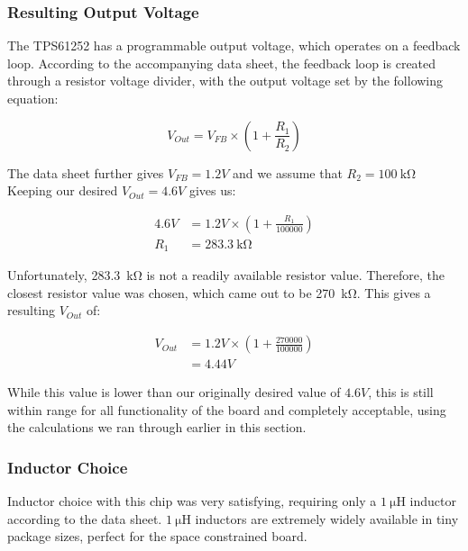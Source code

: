 \documentclass[11pt]{article}
\begin{document}
\subsubsection{Resulting Output Voltage}

The TPS61252 has a programmable output voltage, which operates on a feedback loop. According to the accompanying data sheet, the feedback loop is created through a resistor voltage divider, with the output voltage set by the following equation:

$$ V_{Out} = V_{FB} \times \left( 1 + \frac{R_1}{R_2} \right) $$

The data sheet further gives \(V_{FB} = 1.2V \) and we assume that \(R_2 = \SI{100}{\kilo\ohm}\)\footnotemark {} Keeping our desired \(V_{Out} = 4.6V\) gives us:

\begin{equation}
\begin{aligned}
	4.6V &= 1.2V \times \left( 1 + \frac{R_1}{100000} \right) \\
	R_1 &= \SI{283.3}{\kilo\ohm}
\end{aligned}	
\end{equation}

Unfortunately, \SI{283.3}{\kilo\ohm} is not a readily available resistor value. Therefore, the closest resistor value was chosen, which came out to be \SI{270}{\kilo\ohm}. This gives a resulting \(V_{Out}\) of:

\begin{equation}
\begin{aligned}
	V_{Out} &= 1.2V \times \left( 1 + \frac{270000}{100000} \right) \\
	&= 4.44V
\end{aligned}	
\end{equation}

While this value is lower than our originally desired value of \(4.6V\), this is still within range for all functionality of the board and completely acceptable, using the calculations we ran through earlier in this section.

\subsubsection{Inductor Choice}

Inductor choice with this chip was very satisfying, requiring only a $\SI{1}{\micro\henry}$ inductor according to the data sheet. $\SI{1}{\micro\henry}$ inductors are extremely widely available in tiny package sizes, perfect for the space constrained board. 
\end{document}
